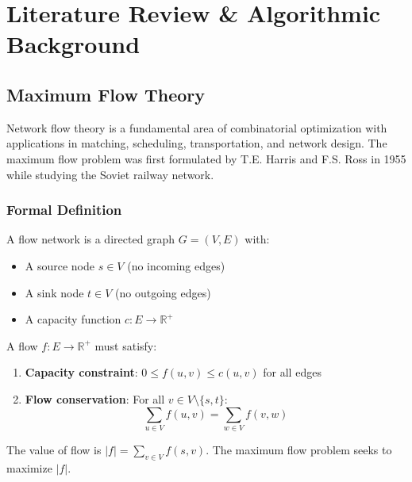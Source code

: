 \documentclass[12pt,a4paper]{article}
\begin{document}
\section{Literature Review \& Algorithmic Background}

\subsection{Maximum Flow Theory}
Network flow theory is a fundamental area of combinatorial optimization with applications in matching, scheduling, transportation, and network design. The maximum flow problem was first formulated by T.E. Harris and F.S. Ross in 1955 \cite{cormen2009} while studying the Soviet railway network.

\subsubsection{Formal Definition}
A flow network is a directed graph \( G = (V, E) \) with:
\begin{itemize}
    \item A source node \( s \in V \) (no incoming edges)
    \item A sink node \( t \in V \) (no outgoing edges)
    \item A capacity function \( c: E \rightarrow \mathbb{R}^+ \)
\end{itemize}

A flow \( f: E \rightarrow \mathbb{R}^+ \) must satisfy:
\begin{enumerate}
    \item \textbf{Capacity constraint}: \( 0 \leq f(u,v) \leq c(u,v) \) for all edges
    \item \textbf{Flow conservation}: For all \( v \in V \setminus \{s,t\} \):
    \[
    \sum_{u \in V} f(u,v) = \sum_{w \in V} f(v,w)
    \]
\end{enumerate}

The value of flow is \( |f| = \sum_{v \in V} f(s,v) \). The maximum flow problem seeks to maximize \( |f| \).
\end{document}
